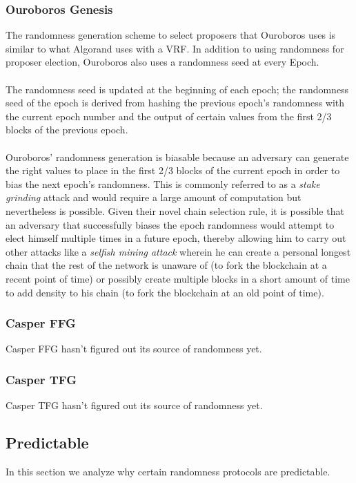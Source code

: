 \documentclass[10pt,journal,compsoc]{IEEEtran}
\begin{document}
\subsubsection{Ouroboros Genesis}
The randomness generation scheme to select proposers that Ouroboros uses is similar to what Algorand uses with a VRF. In addition to using randomness for proposer election, Ouroboros also uses a randomness seed at every Epoch. 
\\\\
The randomness seed is updated at the beginning of each epoch; the randomness seed of the epoch is derived from hashing the previous epoch's randomness with the current epoch number and the output of certain values from the first 2/3 blocks of the previous epoch. 
\\\\ 
Ouroboros' randomness generation is biasable because an adversary can generate the right values to place in the first 2/3 blocks of the current epoch in order to bias the next epoch's randomness. This is commonly referred to as a \emph{stake grinding} attack and would require a large amount of computation but nevertheless is possible.  Given their novel chain selection rule, it is possible that an adversary that successfully biases the epoch randomness would attempt to elect himself multiple times in a future epoch, thereby allowing him to carry out other attacks like a \emph{selfish mining attack} wherein he can create a personal longest chain that the rest of the network is unaware of (to fork the blockchain at a recent point of time) or possibly create multiple blocks in a short amount of time to add density to his chain (to fork the blockchain at an old point of time).
\subsubsection{Casper FFG}
Casper FFG hasn't figured out its source of randomness yet.

\subsubsection{Casper TFG}
Casper TFG hasn't figured out its source of randomness yet.

\subsection{Predictable}
In this section we analyze why certain randomness protocols are predictable. 
\end{document}
